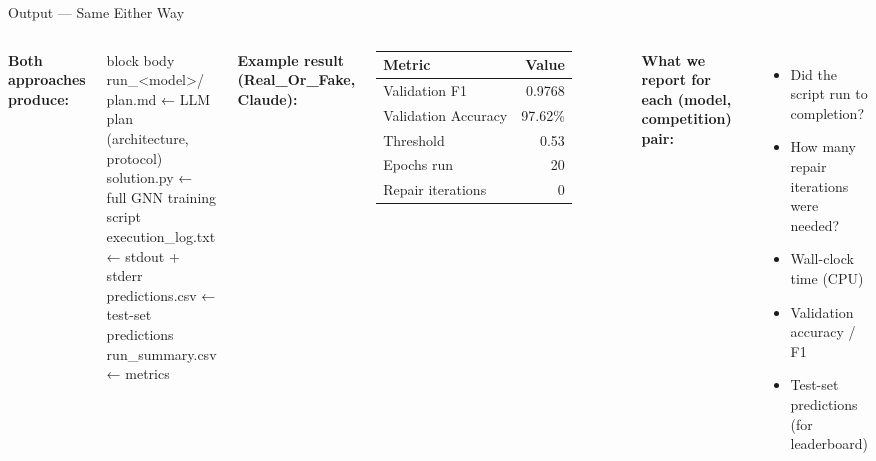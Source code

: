 \documentclass[aspectratio=169,t,10pt]{beamer}
\begin{document}
\begin{frame}{Output --- Same Either Way}

\begin{columns}[T]

\textbf{Both approaches produce:}

\vspace{4pt}
\begin{beamercolorbox}[rounded=true,shadow=false,wd=\linewidth]{block body}
{\scriptsize\ttfamily
run\_<model>/\\
\quad plan.md \hfill\textcolor{GNNgray}{← LLM plan (architecture, protocol)}\\
\quad solution.py \hfill\textcolor{GNNgray}{← full GNN training script}\\
\quad execution\_log.txt \hfill\textcolor{GNNgray}{← stdout + stderr}\\
\quad predictions.csv \hfill\textcolor{GNNgray}{← test-set predictions}\\
\quad run\_summary.csv \hfill\textcolor{GNNgray}{← metrics}\\
}
\end{beamercolorbox}

\vspace{8pt}
\textbf{Example result (Real\_Or\_Fake, Claude):}

\vspace{4pt}
{\small
\begin{tabular}{@{}lr@{}}
\toprule
\textbf{Metric} & \textbf{Value} \\
\midrule
Validation F1       & 0.9768 \\
Validation Accuracy & 97.62\% \\
Threshold           & 0.53 \\
Epochs run          & 20 \\
Repair iterations   & 0 \\
\bottomrule
\end{tabular}
}

\vspace{4pt}
\textbf{What we report for each (model, competition) pair:}

\begin{itemize}\itemsep=4pt
  \item Did the script run to completion?
  \item How many repair iterations were needed?
  \item Wall-clock time (CPU)
  \item Validation accuracy / F1
  \item Test-set predictions (for leaderboard)
\end{itemize}


\end{columns}
\end{frame}
\end{document}

